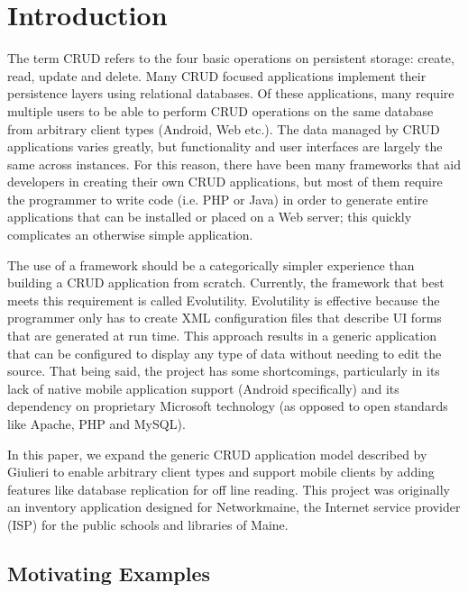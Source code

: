\section{Introduction} \label{sec:intro}






The term CRUD refers to the four basic operations on persistent storage: create,
read, update and delete. Many CRUD focused applications implement their
persistence layers using relational databases. Of these applications, many
require multiple users to be able to perform CRUD operations on the same
database from arbitrary client types (Android, Web
etc.). The data managed by CRUD applications varies greatly, but functionality
and user interfaces are largely the same across instances. For this reason,
there have been many frameworks that aid developers in creating their own CRUD
applications, but most of them require the programmer to write code (i.e. PHP or
Java) in order to generate entire applications that can be installed or placed
on a Web server; this quickly complicates an otherwise simple application. 

The use of a framework should be a categorically simpler experience than
building a CRUD application from scratch. Currently, the framework that best
meets this requirement is called Evolutility. Evolutility
is effective because the programmer only has to create XML configuration files
that describe UI forms that are generated at run time. This approach results in
a generic application that can be configured to display any type of data without
needing to edit the source. That being said, the project has some shortcomings,
particularly in its lack of native mobile application support (Android
specifically) and its dependency on proprietary Microsoft technology (as opposed
to open standards like Apache, PHP and MySQL). 

In this paper, we expand the generic CRUD application model described by
Giulieri to enable arbitrary client types and support mobile clients by adding
features like database replication for off line
reading\cite{giulieri_minimalist_2011}. This project was originally an inventory
application designed for Networkmaine, the Internet service provider (ISP) for
the public schools and libraries of Maine.


\subsection{Motivating Examples} \label{sec:motivation}

